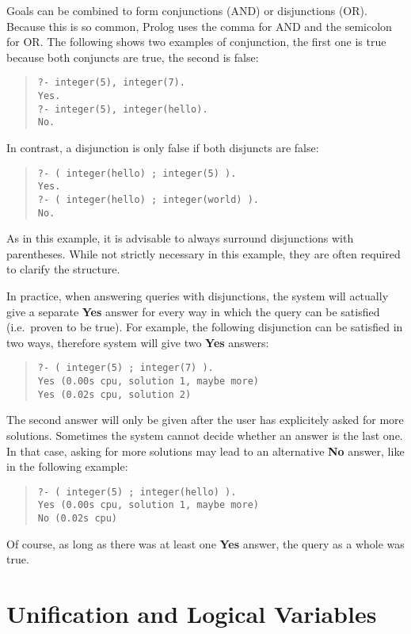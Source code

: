  
Goals can be combined to form conjunctions (AND) or disjunctions (OR).
Because this is so common, Prolog uses the comma for AND and the
semicolon for OR. The following shows two examples of conjunction,
the first one is true because both conjuncts are true, the second is false:
\begin{quote}\begin{verbatim}
?- integer(5), integer(7).
Yes.
?- integer(5), integer(hello).
No.
\end{verbatim}\end{quote}
In contrast, a disjunction is only false if both disjuncts are false:
\begin{quote}\begin{verbatim}
?- ( integer(hello) ; integer(5) ).
Yes.
?- ( integer(hello) ; integer(world) ).
No.
\end{verbatim}\end{quote}
As in this example, it is advisable to always surround disjunctions with
parentheses. While not strictly necessary in this example, they are often
required to clarify the structure.

In practice, when answering queries with disjunctions, the system will
actually give a separate {\bf Yes} answer for every way in which the
query can be satisfied (i.e.\ proven to be true).
For example, the following disjunction can be satisfied in two ways,
therefore system will give two {\bf Yes} answers:
\begin{quote}\begin{verbatim}
?- ( integer(5) ; integer(7) ).
Yes (0.00s cpu, solution 1, maybe more)
Yes (0.02s cpu, solution 2)
\end{verbatim}\end{quote}
The second answer will only be given after the user has explicitely
asked for more solutions.
Sometimes the system cannot decide whether an answer is the last one.
In that case, asking for more solutions may lead to an alternative
{\bf No} answer, like in the following example:
\begin{quote}\begin{verbatim}
?- ( integer(5) ; integer(hello) ).
Yes (0.00s cpu, solution 1, maybe more)
No (0.02s cpu)
\end{verbatim}\end{quote}
Of course, as long as there was at least one {\bf Yes} answer, the query
as a whole was true.


\section{Unification and Logical Variables}

